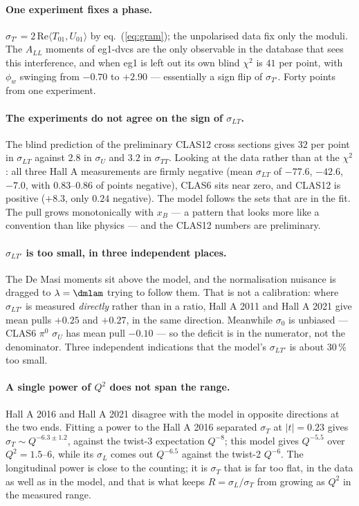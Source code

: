 \documentclass[11pt,a4paper]{article}
\newcommand{\sig}[1]{\sigma_{#1}}
\begin{document}
\paragraph{One experiment fixes a phase.}  $\sig{T'} = 2\,\mathrm{Re}\langle
T_{01}, U_{01}\rangle$ by eq.~(\ref{eq:gram}); the unpolarised data fix only the
moduli.  The $A_{LL}$ moments of eg1-dvcs are the only observable in the
database that sees this interference, and when eg1 is left out its own blind
$\chi^2$ is $41$ per point, with $\phi_w$ swinging from $-0.70$ to $+2.90$ ---
essentially a sign flip of $\sig{T'}$.  Forty points from one experiment.

\paragraph{The experiments do not agree on the sign of $\sig{LT}$.}  The blind
prediction of the preliminary CLAS12 cross sections gives $32$ per point in
$\sig{LT}$ against $2.8$ in $\sig{U}$ and $3.2$ in $\sig{TT}$.  Looking at the
data rather than at the $\chi^2$: all three Hall A measurements are firmly
negative (mean $\sig{LT}$ of $-77.6$, $-42.6$, $-7.0$, with $0.83$--$0.86$ of
points negative), CLAS6 sits near zero, and CLAS12 is positive ($+8.3$, only
$0.24$ negative).  The model follows the sets that are in the fit.  The pull
grows monotonically with $x_B$ --- a pattern that looks more like a convention
than like physics --- and the CLAS12 numbers are preliminary.

\paragraph{$\sig{LT'}$ is too small, in three independent places.}
\label{sec:sigmaltp}
The De Masi moments sit above the model, and the normalisation nuisance is
dragged to $\lambda = \text{\dmlam}$ trying to follow them.  That is not a
calibration: where $\sig{LT'}$ is measured \emph{directly} rather than in a
ratio, Hall A 2011 and Hall A 2021 give mean pulls $+0.25$ and $+0.27$, in the
same direction.  Meanwhile $\sigma_0$ is unbiased --- CLAS6 $\pi^0$ $\sig{U}$
has mean pull $-0.10$ --- so the deficit is in the numerator, not the
denominator.  Three independent indications that the model's $\sig{LT'}$ is
about $30\,\%$ too small.

\paragraph{A single power of $Q^2$ does not span the range.}  Hall A 2016 and
Hall A 2021 disagree with the model in opposite directions at the two ends.
Fitting a power to the Hall A 2016 separated $\sig{T}$ at $|t| = 0.23$ gives
$\sig{T} \sim Q^{-6.3 \pm 1.2}$, against the twist-3 expectation $Q^{-8}$; this
model gives $Q^{-5.5}$ over $Q^2 = 1.5$--$6$, while its $\sig{L}$ comes out
$Q^{-6.5}$ against the twist-2 $Q^{-6}$.  The longitudinal power is close to
the counting; it is $\sig{T}$ that is far too flat, in the data as well as in
the model, and that is what keeps $R = \sig{L}/\sig{T}$ from growing as $Q^2$
in the measured range.
\end{document}
